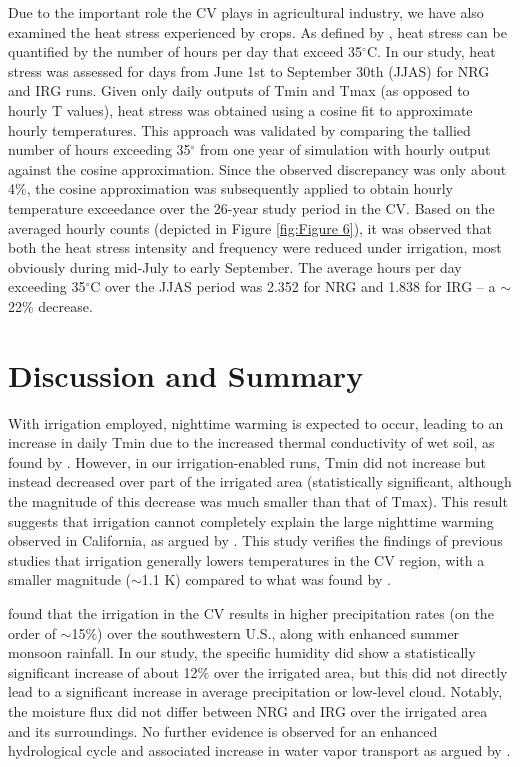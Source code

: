 \documentclass[draft,ms]{agutex}   %
\begin{document}
\begin{article}
Due to the important role the CV plays in agricultural industry, we have also examined the heat stress experienced by crops. As defined by \cite{teixeira2013global}, heat stress can be quantified by the number of hours per day that exceed 35$^\circ$C. In our study, heat stress was assessed for days from June 1st to September 30th (JJAS) for NRG and IRG runs. Given only daily outputs of Tmin and Tmax (as opposed to hourly T values), heat stress was obtained using a cosine fit to approximate hourly temperatures. This approach was validated by comparing the tallied number of hours exceeding 35$^\circ$ from one year of simulation with hourly output against the cosine approximation. Since the observed discrepancy was only about 4$\%$, the cosine approximation was subsequently applied to obtain hourly temperature exceedance over the 26-year study period in the CV. Based on the averaged hourly counts (depicted in Figure \ref{fig:Figure 6}), it was observed that both the heat stress intensity and frequency were reduced under irrigation, most obviously during mid-July to early September. The average hours per day exceeding 35$^\circ$C over the JJAS period was 2.352 for NRG and 1.838 for IRG -- a $\sim$22$\%$ decrease.

\section{Discussion and Summary}

With irrigation employed, nighttime warming is expected to occur, leading to an increase in daily Tmin due to the increased thermal conductivity of wet soil, as found by \cite{kanamaru2008model}. However, in our irrigation-enabled runs, Tmin did not increase but instead decreased over part of the irrigated area (statistically significant, although the magnitude of this decrease was much smaller than that of Tmax). This result suggests that irrigation cannot completely explain the large nighttime warming observed in California, as argued by \citet{bonfils2007empirical}. This study verifies the findings of previous studies that irrigation generally lowers temperatures in the CV region, with a smaller magnitude ($\sim$1.1 K) compared to what was found by \citet{lobell2006biogeophysical}. 

\cite{lo2013irrigation} found that the irrigation in the CV results in higher precipitation rates (on the order of $\sim$15$\%$) over the southwestern U.S., along with enhanced summer monsoon rainfall. In our study, the specific humidity did show a statistically significant increase of about 12$\%$ over the irrigated area, but this did not directly lead to a significant increase in average precipitation or low-level cloud. Notably, the moisture flux did not differ between NRG and IRG over the irrigated area and its surroundings. No further evidence is observed for an enhanced hydrological cycle and associated increase in water vapor transport as argued by \cite{lo2013irrigation}. 


\end{article}
\end{document}
